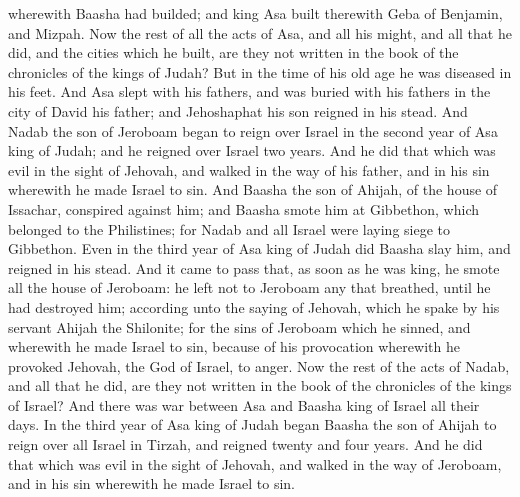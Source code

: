 wherewith Baasha had builded; and king Asa built therewith Geba of Benjamin, and Mizpah.  Now the rest of all the acts of Asa, and all his might, and all that he did, and the cities which he built, are they not written in the book of the chronicles of the kings of Judah? But in the time of his old age he was diseased in his feet. And Asa slept with his fathers, and was buried with his fathers in the city of David his father; and Jehoshaphat his son reigned in his stead.  And Nadab the son of Jeroboam began to reign over Israel in the second year of Asa king of Judah; and he reigned over Israel two years. And he did that which was evil in the sight of Jehovah, and walked in the way of his father, and in his sin wherewith he made Israel to sin. And Baasha the son of Ahijah, of the house of Issachar, conspired against him; and Baasha smote him at Gibbethon, which belonged to the Philistines; for Nadab and all Israel were laying siege to Gibbethon. Even in the third year of Asa king of Judah did Baasha slay him, and reigned in his stead. And it came to pass that, as soon as he was king, he smote all the house of Jeroboam: he left not to Jeroboam any that breathed, until he had destroyed him; according unto the saying of Jehovah, which he spake by his servant Ahijah the Shilonite; for the sins of Jeroboam which he sinned, and wherewith he made Israel to sin, because of his provocation wherewith he provoked Jehovah, the God of Israel, to anger.  Now the rest of the acts of Nadab, and all that he did, are they not written in the book of the chronicles of the kings of Israel? And there was war between Asa and Baasha king of Israel all their days.  In the third year of Asa king of Judah began Baasha the son of Ahijah to reign over all Israel in Tirzah, and reigned twenty and four years. And he did that which was evil in the sight of Jehovah, and walked in the way of Jeroboam, and in his sin wherewith he made Israel to sin. 

